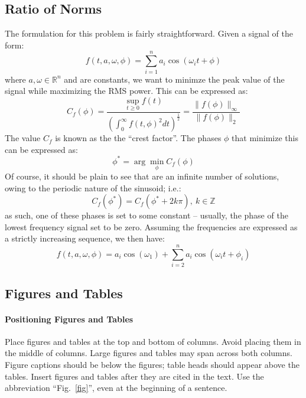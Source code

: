 \documentclass[conference]{IEEEtran}
\begin{document}
\subsection{Ratio of Norms}
The formulation for this problem is fairly straightforward. Given a signal of the form:
\begin{equation}
    f(t,a,\omega,\phi) = \sum_{i=1}^{n}a_i\cos(\omega_it+\phi)
\end{equation}
where $a,\omega\in\mathbb{R}^n$ and are constants, we want to minimze the
peak value of the signal while maximizing the RMS power. This can be
expressed as:
\begin{equation}
    C_f(\phi)
    = \frac{\sup_{t\geq 0} f(t) }{\left(\int_0^\infty f(t,\phi)^2 dt\right)^{\frac{1}{2}}}
    = \frac{\|f(\phi)\|_{\infty}}{\|f(\phi)\|_2}
\end{equation}
The value $C_f$ is known as the the ``crest factor''. The phases $\phi$ that
minimize this can be expressed as:
\begin{equation}
    \phi^* = \arg\min_{\phi} C_f(\phi)
\end{equation}
Of course, it should be plain to see that are an infinite number of solutions,
owing to the periodic nature of the sinusoid; i.e.:
\begin{equation}
    C_{f}(\phi^*) = C_{f}(\phi^*+2k\pi),\ k\in\mathbb{Z}
\end{equation}
as such, one of these phases is set to some constant -- usually, the phase of the
lowest frequency signal set to be zero. Assuming the frequencies are expressed as
a strictly increasing sequence, we then have:
\begin{equation}
    f(t,a,\omega,\phi) = a_i\cos(\omega_1) + \sum_{i=2}^n a_i\cos(\omega_it+\phi_i)
\end{equation}

\subsection{Figures and Tables}
\paragraph{Positioning Figures and Tables} Place figures and tables at the top and
bottom of columns. Avoid placing them in the middle of columns. Large
figures and tables may span across both columns. Figure captions should be
below the figures; table heads should appear above the tables. Insert
figures and tables after they are cited in the text. Use the abbreviation
``Fig.~\ref{fig}'', even at the beginning of a sentence.
\end{document}
